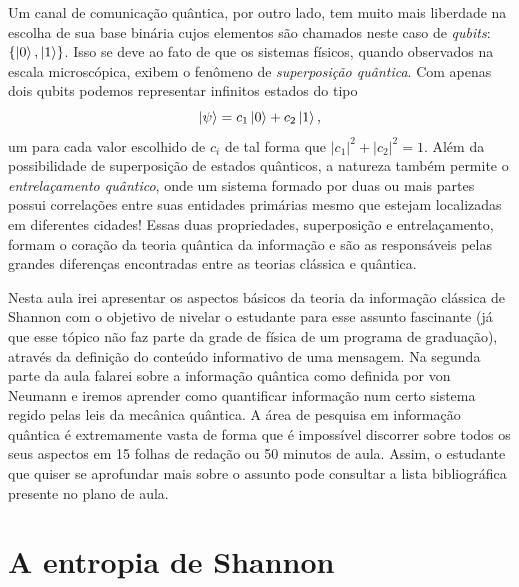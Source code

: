 \documentclass{article}
\begin{document}
Um canal de comunicação quântica, por outro lado, tem muito mais liberdade na escolha de sua base binária cujos elementos são chamados neste caso de \textit{qubits}: $\{ \ket{0},\ket{1} \}$. Isso se deve ao fato de que os sistemas físicos, quando observados na escala microscópica, exibem o fenômeno de \textit{superposição quântica}. Com apenas dois qubits podemos representar infinitos estados do tipo 
\begin{equation}
    \ket{\psi} = c_1 \ket{0} + c_2 \ket{1},
\end{equation}
um para cada valor escolhido de $c_i$ de tal forma que $|c_1|^2 + |c_2|^2 = 1$. Além da possibilidade de superposição de estados quânticos, a natureza também permite o \textit{entrelaçamento quântico}, onde um sistema formado por duas ou mais partes possui correlações entre suas entidades primárias mesmo que estejam localizadas em diferentes cidades! Essas duas propriedades, superposição e entrelaçamento, formam o coração da teoria quântica da informação e são as responsáveis pelas grandes diferenças encontradas entre as teorias clássica e quântica. 

Nesta aula irei apresentar os aspectos básicos da teoria da informação clássica de Shannon com o objetivo de nivelar o estudante para esse assunto fascinante (já que esse tópico não faz parte da grade de física de um programa de graduação), através da definição do conteúdo informativo de uma mensagem. Na segunda parte da aula falarei sobre a informação quântica como definida por von Neumann e iremos aprender como quantificar informação num certo sistema regido pelas leis da mecânica quântica. A área de pesquisa em informação quântica é extremamente vasta de forma que é impossível discorrer sobre todos os seus aspectos em 15 folhas de redação ou 50 minutos de aula. Assim, o estudante que quiser se aprofundar mais sobre o assunto pode consultar a lista bibliográfica presente no plano de aula.


\section{A entropia de Shannon}
\end{document}
